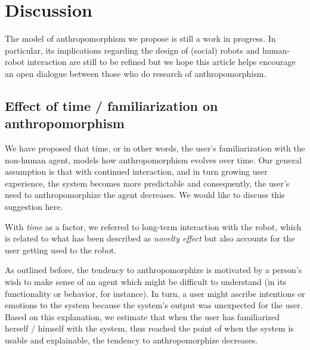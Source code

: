 \documentclass{frontiersSCNS} %
\begin{document}
%
%
%
%
%
%


\section{Discussion}
\label{sec:discussion}

The model of anthropomorphism we propose is still a work in progress. In
particular, its implications regarding the design of (social) robots and
human-robot interaction are still to be refined but we hope this article helps encourage an open dialogue between those who do research of anthropomorphism.

\subsection{Effect of time / familiarization on anthropomorphism}


We have proposed that time, or in other words, the user's familiarization with the non-human agent, models how anthropomorphism evolves over time. Our general assumption is that with continued interaction, and in turn growing user experience, the system becomes more predictable and consequently, the user's need to anthropomorphize the agent decreases. We would like to discuss this suggestion here.

With \textit{time} as a factor, we
referred to long-term interaction with the robot, which is related to what has been
described as \textit{novelty effect} but also accounts for the user getting used
to the robot. 

As outlined before, the tendency to anthropomorphize is motivated by
a person's wish to make sense of an agent which might be difficult to understand
(in its functionality or behavior, for instance). In turn, a user might ascribe
intentions or emotions to the system because the system's output was unexpected
for the user. Based on this explanation, we estimate that when the user has
familiarized herself / himself with the system, thus reached the point of when
the system is usable and explainable, the tendency to anthropomorphize
decreases. 
\end{document}

